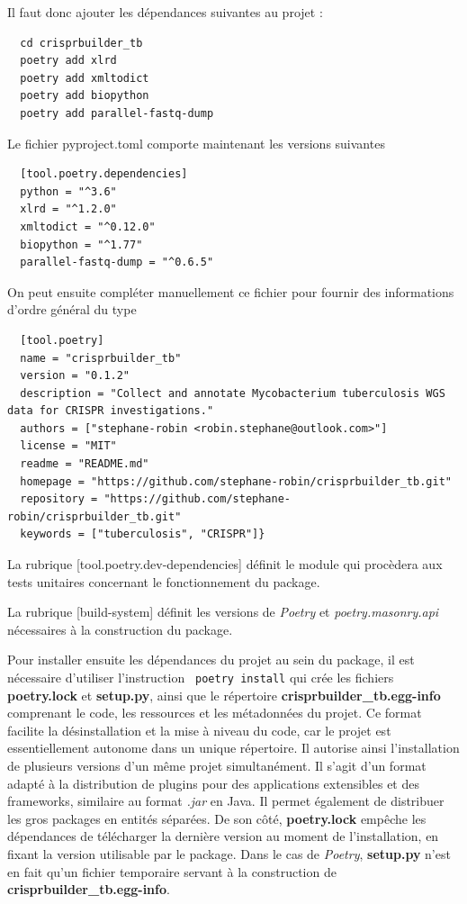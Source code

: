 \documentclass[twoside,a4paper,11pt,frenchb,openany]{report}
\begin{document}
Il faut donc ajouter les dépendances suivantes au projet :
\begin{verbatim}  cd crisprbuilder_tb 
  poetry add xlrd 
  poetry add xmltodict 
  poetry add biopython
  poetry add parallel-fastq-dump \end{verbatim}

Le fichier pyproject.toml comporte maintenant les versions suivantes

\begin{verbatim}  [tool.poetry.dependencies]
  python = "^3.6"
  xlrd = "^1.2.0"
  xmltodict = "^0.12.0"
  biopython = "^1.77"
  parallel-fastq-dump = "^0.6.5"\end{verbatim}

On peut ensuite compléter manuellement ce fichier pour fournir des informations d'ordre général du type

\begin{verbatim}  [tool.poetry]
  name = "crisprbuilder_tb"
  version = "0.1.2"
  description = "Collect and annotate Mycobacterium tuberculosis WGS data for CRISPR investigations."
  authors = ["stephane-robin <robin.stephane@outlook.com>"]
  license = "MIT"
  readme = "README.md"
  homepage = "https://github.com/stephane-robin/crisprbuilder_tb.git"
  repository = "https://github.com/stephane-robin/crisprbuilder_tb.git"
  keywords = ["tuberculosis", "CRISPR"]}\end{verbatim}

La rubrique [tool.poetry.dev-dependencies] définit le module qui procèdera aux tests unitaires concernant le fonctionnement du package.

La rubrique [build-system] définit les versions de \textit{Poetry} et \textit{poetry.masonry.api} nécessaires à la construction du package.

Pour installer ensuite les dépendances du projet au sein du package, il est nécessaire d’utiliser l’instruction
\texttt{ poetry install}
qui crée les fichiers \textbf{poetry.lock} et \textbf{setup.py}, ainsi que le répertoire \textbf{crisprbuilder\_tb.egg-info} comprenant le code, les ressources et les métadonnées du projet. Ce format facilite la désinstallation et la mise à niveau du code, car le projet est essentiellement autonome dans un unique répertoire. Il autorise ainsi l'installation de plusieurs versions d'un même projet simultanément. Il s'agit d'un format adapté à la distribution de plugins pour des applications extensibles et des frameworks, similaire au format \textit{.jar} en Java. Il permet également de distribuer les gros packages en entités séparées. De son côté, \textbf{poetry.lock} empêche les dépendances de télécharger la dernière version au moment de l’installation, en fixant la version utilisable par le package. Dans le cas de \textit{Poetry}, \textbf{setup.py} n'est en fait qu'un fichier temporaire servant à la construction de \textbf{crisprbuilder\_tb.egg-info}. 
\end{document}
